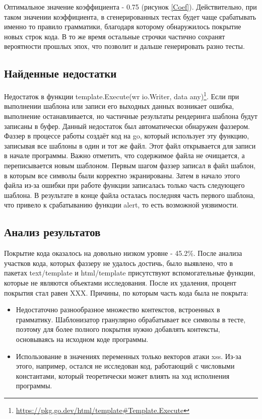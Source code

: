 \documentclass[a4paper]{article}
\begin{document}
Оптимальное значение коэффициента - 0.75 (рисунок \ref{Coef}). Действительно, при таком значении коэффициента, в сгенерированных тестах будет чаще срабатывать именно то правило грамматики, благодаря которому обнаружилось покрытие новых строк кода. В то же время остальные строчки частично сохранят вероятности прошлых эпох, что позволит и дальше генерировать разно тесты.

\subsection{Найденные недостатки}

Недостаток в функции template.Execute(wr io.Writer, data any)\footnote{\href{https://pkg.go.dev/html/template\#Template.Execute}{https://pkg.go.dev/html/template\#Template.Execute}}. Если при выполнении шаблона или записи его выходных данных возникает ошибка, выполнение останавливается, но частичные результаты рендеринга шаблона будут записаны в буфер. Данный недостаток был автоматически обнаружен фаззером. Фаззер в процессе работы создаёт код на go, который использует эту функцию, записывая все шаблоны в один и тот же файл. Этот файл открывается для записи в начале программы. Важно отметить, что содержимое файла не очищается, а  переписывается новым шаблоном. Первым шагом фаззер записал в файл шаблон, в которым все символы были корректно экранированы. Затем в начало этого файла из-за ошибки при работе функции записалась только часть следующего шаблона. В результате в конце файла осталась последняя часть первого шаблона, что привело к срабатыванию функции alert, то есть возможной уязвимости. 

\subsection{Анализ результатов}

Покрытие кода оказалось на довольно низком уровне - 45.2\%. После анализа участков кода, которых фаззеру не удалось достичь, было выявлено, что в пакетах text/template и html/template присутствуют вспомогательные функции, которые не являются объектами исследования. После их удаления, процент покрытия стал равен XXX.
Причины, по которым часть кода была не покрыта:
\begin{itemize}
    \item Недостаточно разнообразное множество контекстов, встроенных в грамматику. Шаблонизатор гранулярно обрабатывает все символы в тесте, поэтому для более полного покрытия нужно добавлять контексты, основываясь на исходном коде программы.
    \item Использование в значениях переменных только векторов атаки xss. Из-за этого, например, остался не исследован код, работающий с числовыми константами, который теоретически может влиять на ход исполнения программы.
\end{itemize}
\end{document}
